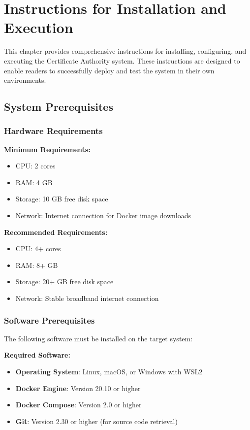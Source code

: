 \chapter{Instructions for Installation and Execution}

This chapter provides comprehensive instructions for installing, configuring, and executing the Certificate Authority system. These instructions are designed to enable readers to successfully deploy and test the system in their own environments.

\section{System Prerequisites}

\subsection{Hardware Requirements}

\textbf{Minimum Requirements:}
\begin{itemize}
    \item CPU: 2 cores
    \item RAM: 4 GB
    \item Storage: 10 GB free disk space
    \item Network: Internet connection for Docker image downloads
\end{itemize}

\textbf{Recommended Requirements:}
\begin{itemize}
    \item CPU: 4+ cores
    \item RAM: 8+ GB
    \item Storage: 20+ GB free disk space
    \item Network: Stable broadband internet connection
\end{itemize}

\subsection{Software Prerequisites}

The following software must be installed on the target system:

\textbf{Required Software:}
\begin{itemize}
    \item \textbf{Operating System}: Linux, macOS, or Windows with WSL2
    \item \textbf{Docker Engine}: Version 20.10 or higher
    \item \textbf{Docker Compose}: Version 2.0 or higher
    \item \textbf{Git}: Version 2.30 or higher (for source code retrieval)
\end{itemize}

